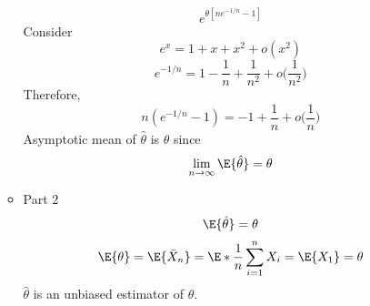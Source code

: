 \begin{Example}{}{}
\begin{enumerate}[label=(\roman*)]
\begin{itemize}
\[                            e^{\theta[ne^{-1/n}-1]} \]
                        Consider
                        \[ e^x=1+x+x^2+o(x^2) \]
                        \[ e^{-1/n}=1-\frac{1}{n} +\frac{1}{n^2}+o
                            \biggl(\frac{1}{n^2}\biggr)  \]
                        Therefore,
                        \[ n(e^{-1/n}-1)=-1+\frac{1}{n} +
                            o\biggl(\frac{1}{n}\biggr) \]
                        Asymptotic mean of $ \hat{\theta} $ is $ \theta $ since
                        \[ \lim\limits_{{n} \to {\infty}} \E{\hat{\theta}}=\theta \]
                  \item Part 2
                        \[ \E{\hat{\theta}}=\theta \]
                        \[ \E{\theta}=\E{\bar{X}_n}=\E*{\frac{1}{n} \sum_{i=1}^{n} X_i}=
                            \E{X_1}=\theta \]
                        $ \hat{\theta} $ is an unbiased estimator of $ \theta $.
              \end{itemize}
    \end{enumerate}
\end{Example}
